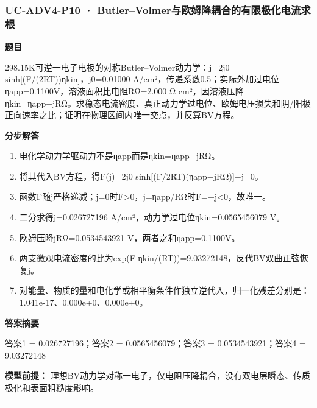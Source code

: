 \documentclass[UTF8,11pt,a4paper]{ctexart}
\begin{document}
\subsubsection*{UC-ADV4-P10 · Butler–Volmer与欧姆降耦合的有限极化电流求根}
\noindent\textbf{题目}\par
298.15K可逆一电子电极的对称Butler–Volmer动力学：j=2j0 sinh[(F/(2RT))ηkin]，j0=0.01000 A/cm²，传递系数0.5；实际外加过电位ηapp=0.1100V，溶液面积比电阻RΩ=2.000 Ω cm²，因溶液压降ηkin=ηapp−jRΩ。求稳态电流密度、真正动力学过电位、欧姆电压损失和阴/阳极正向速率之比；证明在物理区间内唯一交点，并反算BV方程。\par
\medskip\noindent\textbf{分步解答}
\begin{enumerate}
\item 电化学动力学驱动力不是ηapp而是ηkin=ηapp−jRΩ。
\item 将其代入BV方程，得F(j)=2j0 sinh[(F/2RT)(ηapp−jRΩ)]−j=0。
\item 函数F随j严格递减；j=0时F>0，j=ηapp/RΩ时F=−j<0，故唯一。
\item 二分求得j=0.026727196 A/cm²，动力学过电位ηkin=0.0565456079 V。
\item 欧姆压降jRΩ=0.0534543921 V，两者之和ηapp=0.1100V。
\item 两支微观电流密度的比为exp(F ηkin/(RT))=9.03272148，反代BV双曲正弦恢复j。
\item 对能量、物质的量和电化学或相平衡条件作独立逆代入，归一化残差分别是：1.041e-17、0.000e+0、0.000e+0。
\end{enumerate}
\noindent\textbf{答案摘要}\par
答案1 = 0.026727196；答案2 = 0.0565456079；答案3 = 0.0534543921；答案4 = 9.03272148\par
\noindent\textbf{模型前提：}
理想BV动力学对称一电子，仅电阻压降耦合，没有双电层瞬态、传质极化和表面粗糙度影响。\par
\medskip\hrule\medskip
{}
\end{document}
